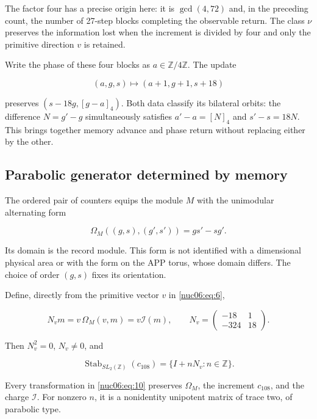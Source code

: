 The factor four has a precise origin here: it is \(\gcd(4,72)\) and, in the preceding count, the number of 27-step blocks completing the observable return. The class \(\nu\) preserves the information lost when the increment is divided by four and only the primitive direction \(v\) is retained.

\begin{corollary}

Write the phase of these four blocks as \(a\in\mathbb Z/4\mathbb Z\). The update

\[
(a,g,s)\longmapsto(a+1,g+1,s+18)
\]

preserves \((s-18g,[g-a]_4)\). Both data classify its bilateral orbits: the difference \(N=g'-g\) simultaneously satisfies \(a'-a=[N]_4\) and \(s'-s=18N\). This brings together memory advance and phase return without replacing either by the other.
\end{corollary}

\subsection{Parabolic generator determined by memory}

The ordered pair of counters equips the module \(M\) with the unimodular alternating form

\[
\Omega_M((g,s),(g',s'))=gs'-sg'.
\]

Its domain is the record module. This form is not identified with a dimensional physical area or with the form on the APP torus, whose domain differs. The choice of order \((g,s)\) fixes its orientation.

\begin{theorem}

Define, directly from the primitive vector \(v\) in \eqref{nuc06:eq:6},

\begin{equation}
N_v m=v\,\Omega_M(v,m)=v\mathcal I(m),\qquad
N_v=\begin{pmatrix}-18&1\\-324&18\end{pmatrix}.
\label{nuc06:eq:9}
\end{equation}

Then \(N_v^2=0\), \(N_v\ne0\), and

\begin{equation}
\boxed{\quad
\operatorname{Stab}_{SL_2(\mathbb Z)}(c_{108})
=\{I+nN_v:n\in\mathbb Z\}.
\quad}
\label{nuc06:eq:10}
\end{equation}

Every transformation in \eqref{nuc06:eq:10} preserves \(\Omega_M\), the increment \(c_{108}\), and the charge \(\mathcal I\). For nonzero \(n\), it is a nonidentity unipotent matrix of trace two, of parabolic type.
\end{theorem}

